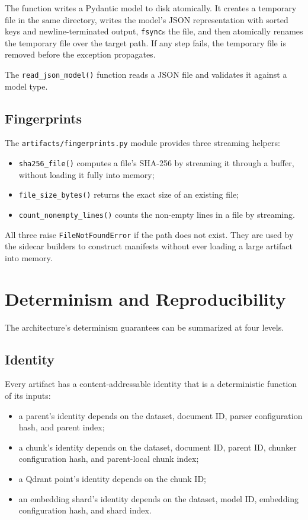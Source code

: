 \documentclass[11pt,a4paper]{article}
\begin{document}
The function writes a Pydantic model to disk atomically. It creates
a temporary file in the same directory, writes the model's JSON
representation with sorted keys and newline-terminated output,
\texttt{fsync}s the file, and then atomically renames the temporary
file over the target path. If any step fails, the temporary file is
removed before the exception propagates.

The \texttt{read\_json\_model()} function reads a JSON file and
validates it against a model type.

\subsection{Fingerprints}
The \texttt{artifacts/fingerprints.py} module provides three
streaming helpers:

\begin{itemize}[leftmargin=1.5em,itemsep=0.15em]
  \item \texttt{sha256\_file()} computes a file's SHA-256 by
    streaming it through a buffer, without loading it fully into
    memory;
  \item \texttt{file\_size\_bytes()} returns the exact size of an
    existing file;
  \item \texttt{count\_nonempty\_lines()} counts the non-empty lines
    in a file by streaming.
\end{itemize}

All three raise \texttt{FileNotFoundError} if the path does not
exist. They are used by the sidecar builders to construct manifests
without ever loading a large artifact into memory.

\section{Determinism and Reproducibility}\label{sec:determinism}

The architecture's determinism guarantees can be summarized at four
levels.

\subsection{Identity}
Every artifact has a content-addressable identity that is a
deterministic function of its inputs:

\begin{itemize}[leftmargin=1.5em,itemsep=0.15em]
  \item a parent's identity depends on the dataset, document ID,
    parser configuration hash, and parent index;
  \item a chunk's identity depends on the dataset, document ID,
    parent ID, chunker configuration hash, and parent-local chunk
    index;
  \item a Qdrant point's identity depends on the chunk ID;
  \item an embedding shard's identity depends on the dataset, model
    ID, embedding configuration hash, and shard index.
\end{itemize}
\end{document}
